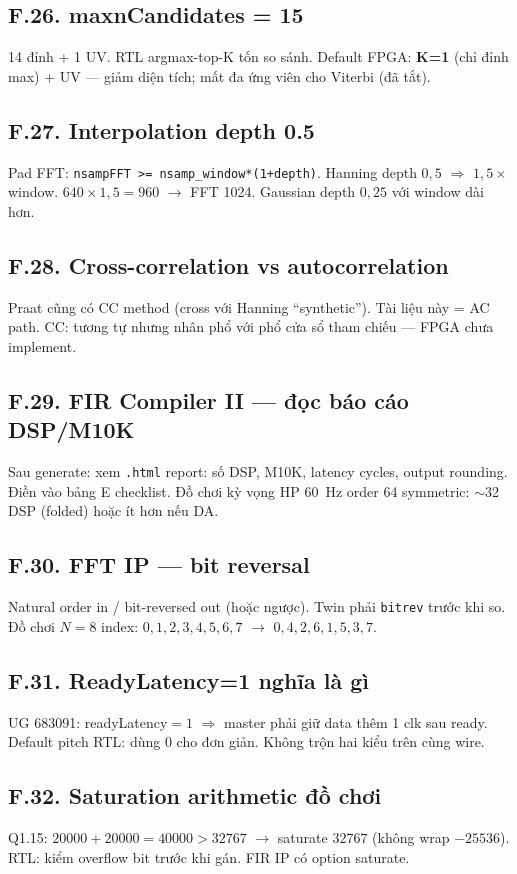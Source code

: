 \subsection*{F.26. maxnCandidates = 15}
14 đỉnh + 1 UV. RTL argmax-top-K tốn so sánh. Default FPGA: \textbf{K=1} (chỉ đỉnh max) + UV --- giảm diện tích; mất đa ứng viên cho Viterbi (đã tắt).

\subsection*{F.27. Interpolation depth 0.5}
Pad FFT: \texttt{nsampFFT >= nsamp\_window*(1+depth)}. Hanning depth $0{,}5$ $\Rightarrow$ $1{,}5\times$ window. $640\times1{,}5=960$ $\to$ FFT 1024. Gaussian depth $0{,}25$ với window dài hơn.

\subsection*{F.28. Cross-correlation vs autocorrelation}
Praat cũng có CC method (cross với Hanning ``synthetic''). Tài liệu này = AC path. CC: tương tự nhưng nhân phổ với phổ cửa sổ tham chiếu --- FPGA chưa implement.

\subsection*{F.29. FIR Compiler II --- đọc báo cáo DSP/M10K}
Sau generate: xem \texttt{.html} report: số DSP, M10K, latency cycles, output rounding. Điền vào bảng E checklist. Đồ chơi kỳ vọng HP 60~Hz order 64 symmetric: $\sim$32 DSP (folded) hoặc ít hơn nếu DA.

\subsection*{F.30. FFT IP --- bit reversal}
Natural order in / bit-reversed out (hoặc ngược). Twin phải \texttt{bitrev} trước khi so. Đồ chơi $N=8$ index: $0,1,2,3,4,5,6,7$ $\to$ $0,4,2,6,1,5,3,7$.

\subsection*{F.31. ReadyLatency=1 nghĩa là gì}
UG 683091: readyLatency$=1$ $\Rightarrow$ master phải giữ data thêm 1 clk sau ready. Default pitch RTL: dùng 0 cho đơn giản. Không trộn hai kiểu trên cùng wire.

\subsection*{F.32. Saturation arithmetic đồ chơi}
Q1.15: $20000+20000=40000>32767$ $\to$ saturate $32767$ (không wrap $-25536$). RTL: kiểm overflow bit trước khi gán. FIR IP có option saturate.

